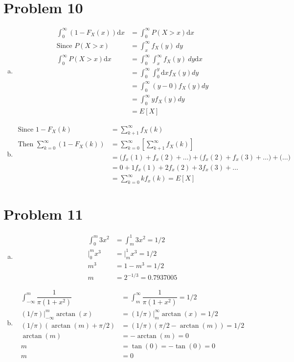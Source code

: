 \documentclass{article}
\newcommand{\dx}{\mathrm{d}x}
\begin{document}
\begin{flushleft}
\section*{Problem 10}
\begin{enumerate}[(a)]
\item 
\begin{align*}
\int_{0}^{\infty}(1-F_X(x))\dx &=\int_{0}^{\infty}P(X>x)\dx\\
\text{Since }  P(X>x)&= \int_{x}^{\infty}f_X(y) \ dy\\
\int_{0}^{\infty}P(X>x)\dx&=\int_{0}^{\infty}\int_{x}^{\infty}f_X(y) \ dy \dx\\
&=\int_{0}^{\infty}\int_{0}^{y}\dx f_X(y) dy\\
&=\int_{0}^{\infty}(y-0)f_X(y)dy\\
&=\int_{0}^{\infty}yf_X(y)dy\\
&=E[X]
\end{align*}
\item 
\begin{align*}
\text{Since } 1-F_X(k)&=\sum_{k+1}^{\infty}f_X(k)\\
\text{Then }
\sum_{k=0}^{\infty}(1-F_X(k))&=\sum_{k=0}^{\infty}\left[\sum_{k+1}^{\infty}f_X(k)\right]\\
&=\bigg(f_x(1)+f_x(2)+\dots\bigg)+\bigg(f_x(2)+f_x(3)+\dots\bigg)+\bigg(\dots \bigg)\\
&=0+1f_x(1)+2f_x(2)+3f_x(3)+\dots\\
&=\sum_{k=0}^{\infty}kf_x(k)=E[X]
\end{align*}
\end{enumerate}
\pagebreak
\section{Problem 11}
\begin{enumerate}[(a)]
\item
\begin{align*}
\int_{0}^{m}3x^2&=\int_{m}^{1}3x^2=1/2\\
\bigg |_{0}^m x^3&=\bigg |_{m}^1 x^3=1/2\\
m^3&=1-m^3=1/2\\
m&=2^{-1/3}=0.7937005
\end{align*}
\item 
\begin{align*}
\int_{-\infty}^{m}\dfrac{1}{\pi(1+x^2)}&=\int_{m}^{\infty}\dfrac{1}{\pi(1+x^2)}=1/2\\
(1/\pi)\bigg |_{-\infty}^{m}\arctan(x)&= (1/\pi)\bigg|_{m}^{\infty}\arctan(x)=1/2\\
(1/\pi) (\arctan(m)+\pi/2)&=(1/\pi)(\pi/2-\arctan(m))=1/2\\
\arctan(m)&=-\arctan(m)=0\\
m&=\tan(0)=-\tan(0)=0\\
m&=0
\end{align*}
\end{enumerate}

\end{flushleft}
\end{document}
